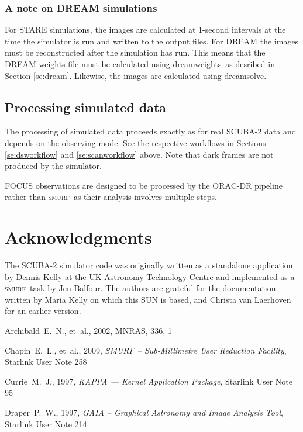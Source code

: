 \documentclass[twoside,11pt]{article}
\newcommand{\xref}[3]{#1}
\newcommand{\xlabel}[1]{}
\renewcommand{\_}{\texttt{\symbol{95}}}
\newcommand{\SMURF}{\textsc{smurf}}
\newcommand{\task}[1]{\textsf{#1}}
\newcommand{\dreamsolve}{\xref{\task{dreamsolve}}{sun258}{DREAMSOLVE}}
\newcommand{\dreamweights}{\xref{\task{dreamweights}}{sun258}{DREAMWEIGHTS}}
\begin{document}
\subsubsection{\xlabel{dreamsim}A note on DREAM simulations\label{se:dreamsim}}

For STARE simulations, the images are calculated at 1-second intervals
at the time the simulator is run and written to the output files. For
DREAM the images must be reconstructed after the simulation has
run. This means that the DREAM weights file must be calculated using
\dreamweights\ as desribed in Section \ref{se:dream}. Likewise, the
images are calculated using \dreamsolve.

\subsection{\xlabel{simdr}Processing simulated data\label{se:simdr}}

The processing of simulated data proceeds exactly as for real SCUBA-2
data and depends on the observing mode. See the respective workflows
in Sections \ref{se:dsworkflow} and \ref{se:scanworkflow} above. Note
that dark frames are not produced by the simulator.

FOCUS observations are designed to be processed by the ORAC-DR
pipeline rather than \SMURF\ as their analysis involves multiple
steps.

\section{Acknowledgments}

The SCUBA-2 simulator code was originally written as a standalone
application by Dennis Kelly at the UK Astronomy Technology Centre and
implemented as a \SMURF\ task by Jen Balfour. The authors are grateful
for the documentation written by Maria Kelly on which this SUN is
based, and Christa van Laerhoven for an earlier version.


\begin{thebibliography}{}

Archibald~E.~N., et~al., 2002, MNRAS, 336, 1

Chapin~E.~L., et~al., 2009, \textit{SMURF -- Sub-Millimetre User Reduction
Facility},
\xref{Starlink User Note 258}{sun258}{} 

Currie~M.~J., 1997, {\it KAPPA --- Kernel Application Package},
\xref{Starlink User Note 95}{sun95}{}

Draper~P.~W., 1997, {\it GAIA -- Graphical Astronomy and Image 
Analysis Tool},
\xref{Starlink User Note 214}{sun214}{}

\end{thebibliography}
 
\end{document}
